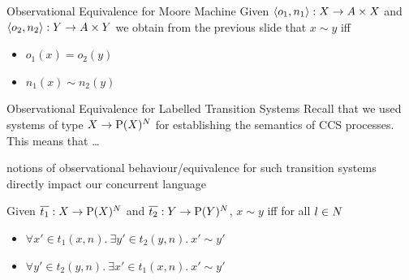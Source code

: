 \documentclass[aspectratio=169]{beamer}
\begin{document}
\begin{frame}{Observational Equivalence for Moore Machine}
  Given $\langle o_1, n_1 \rangle : X \to A \times X$ and
  $\langle o_2, n_2 \rangle : Y \to A \times Y$ we obtain from the previous slide 
  that $x \sim y$ iff
  \begin{itemize}
  \item $o_1(x) = o_2(y)$
  \item $n_1(x) \sim n_2(y)$
  \end{itemize}
\end{frame}

\begin{frame}{Observational Equivalence for Labelled Transition Systems}
  Recall that we used systems of type $X \to \mathrm{P}(X)^N$ for establishing the
  \alert{semantics} of \alert{CCS processes}. This means that \dots

  notions of observational behaviour/equivalence for such transition systems
  directly impact our concurrent language

  \vfill Given $\overline{t_1} : X \to \mathrm{P}(X)^N$ and
  $\overline{t_2} : Y \to \mathrm{P}(Y)^N$, $x \sim y$ iff for all $l \in N$
  \begin{itemize}
  \item $\forall x' \in t_1(x,n).\  \exists y' \in t_2(y,n).\ x' \sim y'$
  \item $\forall y' \in t_2(y,n).\ \exists x' \in t_1(x,n).\ x' \sim y'$
  \end{itemize}
\end{frame}



  
\end{document}
